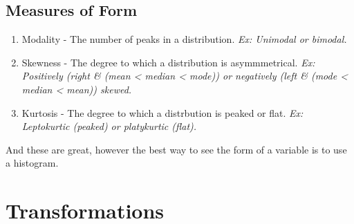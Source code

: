 \documentclass[11pt]{report}
\begin{document}
\subsection{Measures of Form}
\begin{enumerate}
    \item Modality - The number of peaks in a distribution. \textit{Ex: Unimodal or bimodal.}
    \item Skewness - The degree to which a distribution is asymmmetrical. \textit{Ex: Positively (right \& (mean < median < mode)) or negatively (left \& (mode < median < mean)) skewed.} 
    \item Kurtosis - The degree to which a distrbution is peaked or flat. \textit{Ex: Leptokurtic (peaked) or platykurtic (flat).}
\end{enumerate}
And these are great, however the best way to see the form of a variable is to use a histogram.

\section{Transformations}
\end{document}
